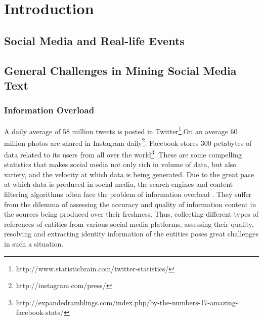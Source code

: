 
\chapter{Introduction} %

\label{introduction} %


\section{Social Media and Real-life Events}

\section{General Challenges in Mining Social Media Text}

\subsection{Information Overload}
A daily average of 58 million tweets is posted in Twitter\footnote{http://www.statisticbrain.com/twitter-statistics/}.On an average 60 million  photos are shared in Instagram daily\footnote{http://instagram.com/press/}. Facebook stores 300 petabytes  of data related to its users from all over the world\footnote{http://expandedramblings.com/index.php/by-the-numbers-17-amazing-facebook-stats/}. These are some compelling statistics that makes social media not only rich in volume of data, but also variety, and the velocity at which data is being generated. Due to the great pace at which data is produced in social media, the search engines and content filtering algorithms often face the problem of information overload \cite{hemp2009death}. They suffer from the dilemma of assessing the accuracy and quality of information content in the sources being produced over their freshness. Thus, collecting different types of references of entities from various social media platforms, assessing their quality, resolving and extracting identity information of the entities poses great challenges in such a situation.

